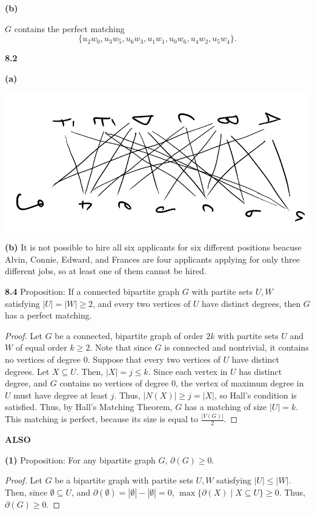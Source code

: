 \documentclass[12pt]{article}
\begin{document}
\noindent\textbf{(b)}

	$G$ contains the perfect matching $$\{u_2w_0, u_3w_5, u_6w_3, u_1w_1, u_0w_6, u_4w_2, u_5w_4\}.$$

\newpage\noindent\textbf{8.2}

\noindent\textbf{(a)} \begin{center}\includegraphics[angle=90,scale=.5]{82a.png}\end{center}

\noindent\textbf{(b)} It is not possible to hire all six applicants for six different positions beacuse Alvin, Connie, Edward, and Frances are four applicants applying for only three different jobs, so at least one of them cannot be hired.

\newpage\noindent\textbf{8.4} Proposition: If a connected bipartite graph $G$ with partite sets $U, W$ satisfying $|U| = |W| \geq 2$, and every two vertices of $U$ have distinct degrees, then $G$ has a perfect matching.
\begin{proof}
	Let $G$ be a connected, bipartite graph of order $2k$ with partite sets $U$ and $W$ of equal order $k \geq 2$.
	Note that since $G$ is connected and nontrivial, it contains no vertices of degree 0.
	Suppose that every two vertices of $U$ have distinct degrees.
	Let $X \subseteq U$.
	Then, $|X| = j \leq k$.
	Since each vertex in $U$ has distinct degree, and $G$ contains no vertices of degree 0, the vertex of maximum degree in $U$ must have degree at least $j$.
	Thus, $|N(X)| \geq j = |X|$, so Hall's condition is satisfied.
	Thus, by Hall's Matching Theorem, $G$ has a matching of size $|U| = k$.
	This matching is perfect, because its size is equal to $\frac{|V(G)|}{2}$.
\end{proof}
	
\newpage\noindent\textbf{ALSO}

\noindent\textbf{(1)} Proposition: For any bipartite graph $G$, $\partial(G) \geq 0$.
\begin{proof}
	Let $G$ be a bipartite graph with partite sets $U,W$ satisfying $|U| \leq |W|$.
	Then, since $\emptyset \subseteq U$, and $\partial(\emptyset) = |\emptyset| - |\emptyset| = 0$, $\max\{\partial(X) \mid X \subseteq U\} \geq 0$.
	Thus, $\partial(G) \geq 0$.
\end{proof}
\end{document}
